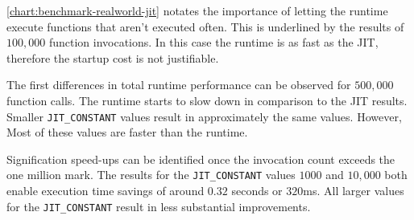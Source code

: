\autoref{chart:benchmark-realworld-jit} notates the importance of letting the
runtime execute functions that aren't executed often. This is underlined by the
results of $100,000$ function invocations. In this case the runtime is as fast
as the JIT, therefore the startup cost is not justifiable. 

The first differences in total runtime performance can be observed for
$500,000$ function calls. The runtime starts to slow down in comparison to the
JIT results. Smaller \texttt{JIT\_CONSTANT} values result in approximately the
same values. However, Most of these values are faster than the runtime. 

Signification speed-ups can be identified once the invocation count exceeds the
one million mark. The results for the \texttt{JIT\_CONSTANT} values $1000$ and
$10,000$ both enable execution time savings of around $0.32$ seconds or
$320$ms. All larger values for the \texttt{JIT\_CONSTANT} result in less
substantial improvements.

